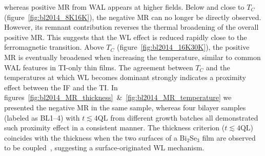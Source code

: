 %
whereas positive MR from WAL appears at higher fields. Below and close to $T_C$ (figure~\ref{fig:bl2014_8K16K}), the negative MR can no longer be directly observed. However, its remnant contribution reverses the thermal broadening of the overall positive MR. This suggests that the WL effect is reduced rapidly close to the ferromagnetic transition. Above $T_C$ (figure~\ref{fig:bl2014_16K30K}), the positive MR is eventually broadened when increasing the temperature, similar to common WAL features in TI-only thin films. The agreement between $T_C$ and the temperatures at which WL becomes dominant strongly indicates a proximity effect between the IF and the TI. In figures~\ref{fig:bl2014_MR_thickness}~\&~\ref{fig:bl2014_MR_temperature} we presented the negative MR in the same sample, whereas four bilayer samples (labeled as BL1--4) with $t\lesssim4\mathrm{QL}$ from different growth batches all demonstrated such proximity effect in a consistent manner. The thickness criterion ($t\lesssim4\mathrm{QL}$) coincides with the thickness when the two surfaces of a Bi$_2$Se$_3$ film are observed to be coupled~\cite{ARPES_thickness}, suggesting a surface-originated WL mechanism.

